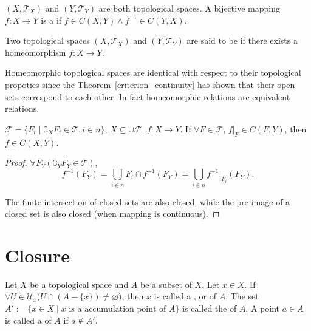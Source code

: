 \documentclass[openany]{book}
\begin{document}
\begin{definition}\label{homeomorphism}
$(X,\mathscr{T}_X)$ and $(Y,\mathscr{T}_Y)$ are both topological spaces. A bijective mapping $f \colon X\to Y$ is a  if $f \in C( X, Y) \wedge f ^{ -1} \in C( Y, X)$. 
\end{definition}
\begin{definition}\label{homeomorphic}
Two topological spaces $(X,\mathscr{T}_X)$ and $(Y, \mathscr{T}_Y)$ are said to be  if there exists a homeomorphism $f \colon X\to Y$.
\end{definition}

Homeomorphic topological spaces are identical with respect to their topological propoties since the Theorem~\ref{criterion_continuity} has shown that their open sets correspond to each other. In fact homeomorphic relations are equivalent relations.

\begin{lemma}%
	\label{lemma: gluing}
	$\mathscr F = \{F_i \mid \complement_X F_i \in \mathscr T, i \in n\}$, $X \subseteq {\cup \mathscr F}$, $f \colon X \to Y$. 
	If $\forall F \in \mathscr F$, $f \vert_F \in C(F, Y)$, then $f \in C(X, Y)$.
\end{lemma}
\begin{proof}
	$\forall F_Y ( \complement_Y F_Y \in \mathscr T)$, 
	\begin{equation*}
		f^{-1}(F_Y) = \bigcup_{i \in n} F_i \cap f^{-1}(F_Y) = \bigcup_{i \in n} f^{-1} \vert_{F_i} (F_Y).
	\end{equation*}

	The finite intersection of closed sets are also closed, while the pre-image of a closed set is also closed (when mapping is continuous). 
\end{proof}

\section{Closure}
\begin{definition}\label{accumulation_point}
Let $X$ be a topological space and $A$ be a subset of $X$. Let $x\in X$.
If $\forall U\in \mathscr U_x \big(
	U\cap (A-\{x\}) \neq \varnothing\big)$, 
then $x$ is called a ,  or  of $A$. 
The set $A' := \{x\in X\mid x\text{ is a accumulation point of } A\}$ is called the  of $A$.
A point $a\in A$ is called a  of $A$ if $a\notin A'$.
\end{definition}
\end{document}
